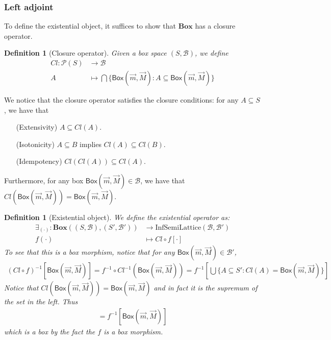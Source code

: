 \documentclass[12pt]{article}
\newtheorem{definition}[theorem]{Definition}
\newtheorem{claim}{Claim}
\newcommand{\InfSemiLattice}{\text{InfSemiLattice}}
\newcommand{\bobject}{\mathsf{Box}}
\begin{document}
\subsubsection{Left adjoint} 
To define the existential object, it suffices to show that $\mathbf{Box}$
has a closure operator.
\begin{definition}[Closure operator]
    Given a box space $(S,\mathcal{B})$, we define
    \begin{align*}
        Cl:\mathcal{P}(S)&\to\mathcal{B}
        \\
        A&\mapsto\bigcap\{\bobject(\vec{m},\vec{M}):A\subseteq\bobject(\vec{m},\vec{M})\}
    \end{align*}
\end{definition}
We notice that the closure operator satisfies the closure conditions: for any $A\subseteq S$, we have that
\begin{enumerate}
    \item[(Extensivity)] $A\subseteq Cl(A)$.
    \item[(Isotonicity)] $A\subseteq B$ implies $Cl(A)\subseteq Cl(B)$.
    \item[(Idempotency)] $Cl(Cl(A))\subseteq Cl(A)$.
\end{enumerate}
Furthermore, for any box $\bobject(\vec{m},\vec{M})\in\mathcal{B}$, we have that
$Cl(\bobject(\vec{m},\vec{M}))=\bobject(\vec{m},\vec{M})$.
\begin{definition}[Existential object]
    We define the existential operator as:
    \begin{align*}
        \exists_{(\cdot)}:\mathbf{Box}((S,\mathcal{B}),(S',\mathcal{B}'))&\to\InfSemiLattice(\mathcal{B},\mathcal{B}')
        \\
        f(\cdot)&\mapsto Cl\circ f[\cdot]
    \end{align*}
    To see that this is a box morphism, notice that for any $\bobject(\vec{m},\vec{M})\in\mathcal{B}'$,
    \begin{gather*}
        (Cl\circ f)^{-1}[\bobject(\vec{m},\vec{M})]=f^{-1}\circ Cl^{-1}(\bobject(\vec{m},\vec{M}))=
        f^{-1}\left[\bigcup \{A\subseteq S':Cl(A)=\bobject(\vec{m},\vec{M})\}\right]
    \end{gather*}
    Notice that $Cl(\bobject(\vec{m},\vec{M}))=\bobject(\vec{m},\vec{M})$ and in fact
    it is the supremum of the set in the left. Thus
    \begin{gather*}
        =f^{-1}[\bobject(\vec{m},\vec{M})]
    \end{gather*}
    which is a box by the fact the $f$ is a box morphism.
\end{definition}
\end{document}
